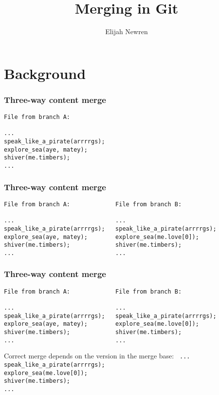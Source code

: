 \documentclass[t]{beamer}
\title{Merging in Git}
\author{Elijah Newren}
\institute{}
\date{}
\begin{document}


\section{Background}

\begin{frame}[containsverbatim]
  \frametitle{Three-way content merge}

  {\footnotesize
  \begin{verbatim}
File from branch A:
    
...
speak_like_a_pirate(arrrrgs);
explore_sea(aye, matey);
shiver(me.timbers);
...
  \end{verbatim}
  }
  
\end{frame}

\begin{frame}[containsverbatim]
  \frametitle{Three-way content merge}

  {\footnotesize
  \begin{verbatim}
File from branch A:             File from branch B:

...                             ...                             
speak_like_a_pirate(arrrrgs);   speak_like_a_pirate(arrrrgs);   
explore_sea(aye, matey);        explore_sea(me.love[0]);
shiver(me.timbers);             shiver(me.timbers);             
...                             ...
  \end{verbatim}
  }
  
\end{frame}

\begin{frame}[containsverbatim]
  \frametitle{Three-way content merge}

  {\footnotesize
  \begin{verbatim}
File from branch A:             File from branch B:

...                             ...                             
speak_like_a_pirate(arrrrgs);   speak_like_a_pirate(arrrrgs);   
explore_sea(aye, matey);        explore_sea(me.love[0]);
shiver(me.timbers);             shiver(me.timbers);             
...                             ...
  \end{verbatim}
  }

  \vspace*{-1.2em}
  Correct merge depends on the version in the merge base:
  {\footnotesize
  \texttt{
...\\
speak\_like\_a\_pirate(arrrrgs);\\
explore\_sea(me.love[0]);\\
shiver(me.timbers);\\
...
  }}
  
\end{frame}
\end{document}
